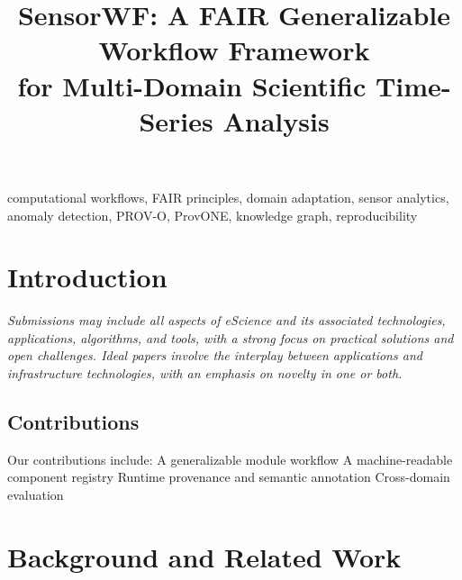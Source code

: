 \documentclass[conference]{IEEEtran}
\begin{document}
\title{SensorWF: A FAIR Generalizable Workflow Framework\\for Multi-Domain Scientific Time-Series Analysis}

\author{
}

\maketitle

\begin{abstract}

\end{abstract}

\begin{IEEEkeywords}
computational workflows, FAIR principles, domain adaptation, sensor analytics,
anomaly detection, PROV-O, ProvONE, knowledge graph, reproducibility
\end{IEEEkeywords}


\section{Introduction}

\textit{Submissions may include all aspects of eScience and its associated technologies, applications, algorithms, and tools, with a strong focus on practical solutions and open challenges. Ideal papers involve the interplay between applications and infrastructure technologies, with an emphasis on novelty in one or both.}

\subsection{Contributions}
Our contributions include:
A generalizable module workflow
A machine-readable component registry
Runtime provenance and semantic annotation
Cross-domain evaluation



\section{Background and Related Work}
\label{sec:background}
\end{document}
